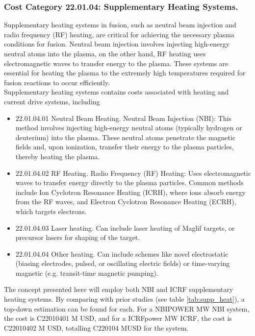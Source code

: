 \subsubsection*{Cost Category 22.01.04: Supplementary Heating Systems.}

Supplementary heating systems in fusion, such as neutral beam injection and radio frequency (RF) heating, are critical for achieving the necessary plasma conditions for fusion. Neutral beam injection involves injecting high-energy neutral atoms into the plasma, on the other hand, RF heating uses electromagnetic waves to transfer energy to the plasma. These systems are essential for heating the plasma to the extremely high temperatures required for fusion reactions to occur efficiently.\\

Supplementary heating systems contains costs associated with heating and current drive systems, including 

\begin{itemize}
    \item 22.01.04.01 Neutral Beam Heating.   Neutral Beam Injection (NBI): This method involves injecting high-energy neutral atoms (typically hydrogen or deuterium) into the plasma. These neutral atoms penetrate the magnetic fields and, upon ionization, transfer their energy to the plasma particles, thereby heating the plasma.
    \item 22.01.04.02 RF Heating.  Radio Frequency (RF) Heating: Uses electromagnetic waves to transfer energy directly to the plasma particles. Common methods include Ion Cyclotron Resonance Heating (ICRH), where ions absorb energy from the RF waves, and Electron Cyclotron Resonance Heating (ECRH), which targets electrons.
    \item 22.01.04.03 Laser heating.  Can include laser heating of Maglif targets, or precursor lasers for shaping of the target.
    \item 22.01.04.04 Other heating.  Can include schemes like novel electrostatic (biasing electrodes, pulsed, or oscillating electric fields) or time-varying magnetic (e.g. transit-time magnetic pumping).
\end{itemize}


The concept presented here will employ both NBI and ICRF supplementary heating systems. By comparing with prior studies (see table \ref{tab:supp_heat}), a top-down estimation can be found for each. For a NBIPOWER MW NBI system, the cost is C22010401 M USD, and for a ICRFpower MW ICRF, the cost is C22010402 M USD, totalling C220104 MUSD for the system.

